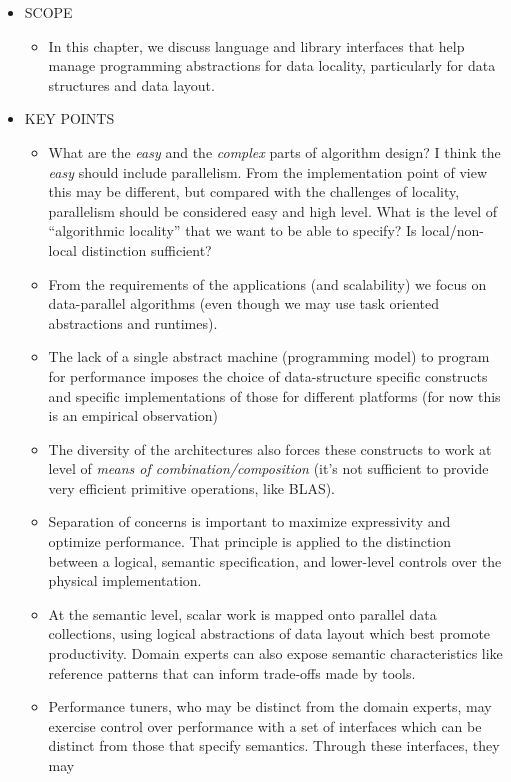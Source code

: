 \begin{itemize}
\item SCOPE
  \begin{itemize}
  \item In this chapter, we discuss language and library interfaces that help manage programming abstractions for data locality, particularly for data structures and data layout. 
  \end{itemize}
\item KEY POINTS
  \begin{itemize}
  \item {}What are the {\em easy} and the {\em complex} parts of algorithm design? I think the {\em easy} should include parallelism. From the implementation point of view this may be different, but compared with the challenges of locality, parallelism should be considered easy and high level. What is the level of ``algorithmic locality'' that we want to be able to specify? Is local/non-local distinction sufficient?
  \item From the requirements of the applications (and scalability) we focus on data-parallel algorithms (even though we may use task oriented abstractions and runtimes).
  \item The lack of a single abstract machine (programming model) to program for performance imposes the choice of data-structure specific constructs and specific implementations of those for different platforms (for now this is an empirical observation)
  \item {}The diversity of the architectures also forces these constructs to work at level of {\em means of combination/composition} (it's not sufficient to provide very efficient primitive operations, like BLAS).
  \item Separation of concerns is important to maximize expressivity and optimize performance.  That principle is applied to the distinction between a logical, semantic specification, and lower-level controls over the physical implementation.
  \item At the semantic level, scalar work is mapped onto parallel data collections, using logical abstractions of data layout which best promote productivity.  Domain experts can also expose semantic characteristics like reference patterns that can inform trade-offs made by tools.
  \item Performance tuners, who may be distinct from the domain experts, may exercise control over performance with a set of interfaces which can be distinct from those that specify semantics.  Through these interfaces, they may 

\end{itemize}
\end{itemize}
